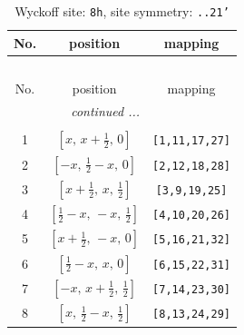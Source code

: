 \documentclass[fleqn,8pt]{jsarticle}
\begin{document}
\begin{longtable}{ccc}
\caption{Wyckoff site: {\tt 8h}, site symmetry: {\tt ..21'}}
 \\
 \hline \hline
No. & position & mapping \\ \hline \endfirsthead

\multicolumn{2}{l}{\tablename\ \thetable{}} \\
 \hline \hline
No. & position & mapping \\ \hline \endhead

 \hline \hline
\multicolumn{2}{r}{\footnotesize\it continued ...} \\ \endfoot

 \hline \hline
\multicolumn{2}{r}{} \\ \endlastfoot

1 & $\left[ x,\, x + \frac{1}{2},\, 0 \right]$ & {\tt [1,11,17,27]} \\ \hline
2 & $\left[ - x,\, \frac{1}{2} - x,\, 0 \right]$ & {\tt [2,12,18,28]} \\ \hline
3 & $\left[ x + \frac{1}{2},\, x,\, \frac{1}{2} \right]$ & {\tt [3,9,19,25]} \\ \hline
4 & $\left[ \frac{1}{2} - x,\, - x,\, \frac{1}{2} \right]$ & {\tt [4,10,20,26]} \\ \hline
5 & $\left[ x + \frac{1}{2},\, - x,\, 0 \right]$ & {\tt [5,16,21,32]} \\ \hline
6 & $\left[ \frac{1}{2} - x,\, x,\, 0 \right]$ & {\tt [6,15,22,31]} \\ \hline
7 & $\left[ - x,\, x + \frac{1}{2},\, \frac{1}{2} \right]$ & {\tt [7,14,23,30]} \\ \hline
8 & $\left[ x,\, \frac{1}{2} - x,\, \frac{1}{2} \right]$ & {\tt [8,13,24,29]} \\
\end{longtable}
\renewcommand{\arraystretch}{1.2}
\end{document}
